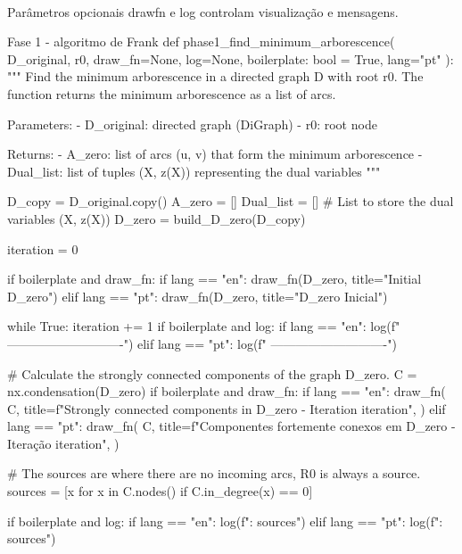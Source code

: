 \documentclass[12pt,a4paper]{article}
\def\texttt#1{#1}%
\def\_{}%
\begin{document}
\paragraph{}
Parâmetros opcionais \texttt{draw\_fn} e \texttt{log} controlam visualização e mensagens.

\begin{pybox}{Fase 1 - algoritmo de Frank}
def phase1_find_minimum_arborescence(
    D_original, r0, draw_fn=None, log=None, boilerplate: bool = True, lang="pt"
):
    """
    Find the minimum arborescence in a directed graph D with root r0.
    The function returns the minimum arborescence as a list of arcs.

    Parameters:
        - D_original: directed graph (DiGraph)
        - r0: root node

    Returns:
        - A_zero: list of arcs (u, v) that form the minimum arborescence
        - Dual_list: list of tuples (X, z(X)) representing the dual variables
    """

    D_copy = D_original.copy()
    A_zero = []
    Dual_list = []  # List to store the dual variables (X, z(X))
    D_zero = build_D_zero(D_copy)

    iteration = 0

    if boilerplate and draw_fn:
        if lang == "en":
            draw_fn(D_zero, title="Initial D_zero")
        elif lang == "pt":
            draw_fn(D_zero, title="D_zero Inicial")

    while True:
        iteration += 1
        if boilerplate and log:
            if lang == "en":
                log(f" ----------------------------")
            elif lang == "pt":
                log(f" ----------------------------")

        # Calculate the strongly connected components of the graph D_zero.
        C = nx.condensation(D_zero)
        if boilerplate and draw_fn:
            if lang == "en":
                draw_fn(
                    C,
                    title=f"Strongly connected components in D_zero - Iteration {iteration}",
                )
            elif lang == "pt":
                draw_fn(
                    C,
                    title=f"Componentes fortemente conexos em D_zero - Iteração {iteration}",
                )

        # The sources are where there are no incoming arcs, R0 is always a source.
        sources = [x for x in C.nodes() if C.in_degree(x) == 0]

        if boilerplate and log:
            if lang == "en":
                log(f"\nSources: {sources}")
            elif lang == "pt":
                log(f"\nFontes: {sources}")


\end{pybox}
\end{document}
